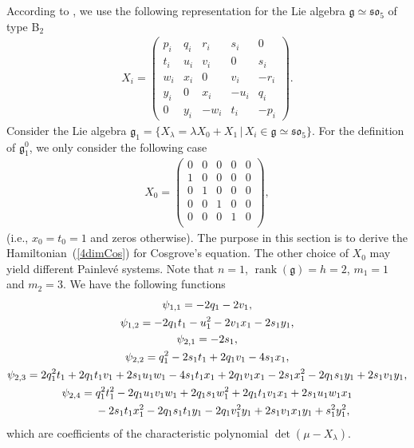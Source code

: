 \documentclass[pdftex]{sigma}
\numberwithin{equation}{section}
\begin{document}
According to \cite{DS}, we use the following representation for the Lie algebra $\mathfrak{g} \simeq \mathfrak{so}_5$ of type B$_2$
\begin{gather*}
X_i = \left(
\begin{matrix}
p_i & q_i & r_i & s_i & 0 \\
t_i & u_i & v_i & 0 & s_i \\
w_i & x_i & 0 & v_i & -r_i \\
y_i & 0 & x_i & -u_i & q_i \\
0 & y_i & -w_i & t_i & -p_i
\end{matrix}
\right).
\end{gather*}
Consider the Lie algebra $\mathfrak{g}_1 = \{ X_\lambda = \lambda X_0 + X_1 \, | \, X_i\in \mathfrak{g} \simeq \mathfrak{so}_5\}$. For the def\/inition of $\mathfrak{g}^0_1$, we only consider the following case
\begin{gather*}
X_0 = \left(
\begin{matrix}
0 & 0 & 0 & 0 & 0 \\
1 & 0 & 0 & 0 & 0 \\
0 & 1 & 0 & 0 & 0 \\
0 & 0 & 1 & 0 & 0 \\
0 & 0 & 0 & 1 & 0 \\
\end{matrix}
\right),
\end{gather*} (i.e., $x_0=t_0=1$ and zeros otherwise). The purpose in this section is to derive the Hamiltonian~(\ref{4dimCos}) for Cosgrove's equation. The other choice of $X_0$ may yield dif\/ferent Painlev\'{e} systems. Note that $n=1$, $\operatorname{rank}(\mathfrak{g}) = h=2$, $m_1 = 1$ and $m_2 = 3$.
We have the following functions
\begin{gather*}
\psi_{1,1} = -2q_1 - 2v_1, \\
\psi_{1,2} = -2q_1t_1 - u_1^2 - 2v_1x_1 - 2s_1y_1, \\
\psi_{2,1} = -2s_1, \\
\psi_{2,2} = q_1^2 - 2s_1t_1 + 2q_1v_1 - 4s_1x_1, \\
\psi_{2,3} = 2q_1^2t_1 + 2q_1t_1v_1 + 2s_1u_1w_1 - 4s_1t_1x_1 + 2q_1v_1x_1
 -2s_1x_1^2 - 2q_1s_1y_1 + 2s_1v_1y_1, \\
\psi_{2,4} = q_1^2t_1^2 - 2q_1u_1v_1w_1 + 2q_1s_1w_1^2 + 2q_1t_1v_1x_1 + 2s_1u_1w_1x_1 \\
\hphantom{\psi_{2,4} =}{} -2s_1t_1x_1^2 - 2q_1s_1t_1y_1 - 2q_1v_1^2y_1 + 2s_1v_1x_1y_1 + s_1^2y_1^2,
\end{gather*}
which are coef\/f\/icients of the characteristic polynomial $\det (\mu - X_\lambda )$.
\end{document}
